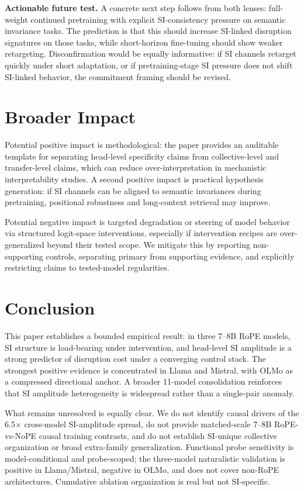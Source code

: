 \documentclass{article}
\begin{document}
\textbf{Actionable future test.} A concrete next step follows from both lenses: full-weight continued pretraining with explicit SI-consistency pressure on semantic invariance tasks. The prediction is that this should increase SI-linked disruption signatures on those tasks, while short-horizon fine-tuning should show weaker retargeting. Disconfirmation would be equally informative: if SI channels retarget quickly under short adaptation, or if pretraining-stage SI pressure does not shift SI-linked behavior, the commitment framing should be revised.

\section{Broader Impact}

Potential positive impact is methodological: the paper provides an auditable template for separating head-level specificity claims from collective-level and transfer-level claims, which can reduce over-interpretation in mechanistic interpretability studies. A second positive impact is practical hypothesis generation: if SI channels can be aligned to semantic invariances during pretraining, positional robustness and long-context retrieval may improve.

Potential negative impact is targeted degradation or steering of model behavior via structured logit-space interventions, especially if intervention recipes are over-generalized beyond their tested scope. We mitigate this by reporting non-supporting controls, separating primary from supporting evidence, and explicitly restricting claims to tested-model regularities.

\section{Conclusion}

This paper establishes a bounded empirical result: in three 7--8B RoPE models, SI structure is load-bearing under intervention, and head-level SI amplitude is a strong predictor of disruption cost under a converging control stack. The strongest positive evidence is concentrated in Llama and Mistral, with OLMo as a compressed directional anchor. A broader 11-model consolidation reinforces that SI amplitude heterogeneity is widespread rather than a single-pair anomaly.

What remains unresolved is equally clear. We do not identify causal drivers of the 6.5$\times$ cross-model SI-amplitude spread, do not provide matched-scale 7--8B RoPE-vs-NoPE causal training contrasts, and do not establish SI-unique collective organization or broad extra-family generalization. Functional probe sensitivity is model-conditional and probe-scoped; the three-model naturalistic validation is positive in Llama/Mistral, negative in OLMo, and does not cover non-RoPE architectures. Cumulative ablation organization is real but not SI-specific.
\end{document}
